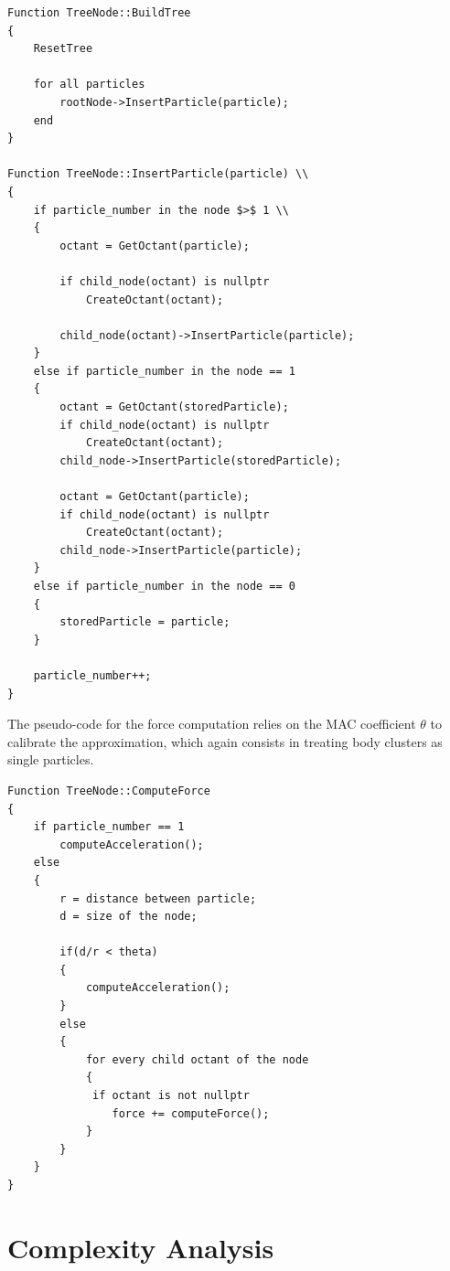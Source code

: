 \documentclass{article}
\begin{document}
\begin{boxA}
\begin{verbatim}
Function TreeNode::BuildTree
{
    ResetTree

    for all particles
        rootNode->InsertParticle(particle);
    end
}

Function TreeNode::InsertParticle(particle) \\
{
    if particle_number in the node $>$ 1 \\
    {
        octant = GetOctant(particle);

        if child_node(octant) is nullptr
            CreateOctant(octant);

        child_node(octant)->InsertParticle(particle);
    }
    else if particle_number in the node == 1
    {
        octant = GetOctant(storedParticle);
        if child_node(octant) is nullptr 
            CreateOctant(octant);
        child_node->InsertParticle(storedParticle);
        
        octant = GetOctant(particle);
        if child_node(octant) is nullptr 
            CreateOctant(octant);
        child_node->InsertParticle(particle);
    }
    else if particle_number in the node == 0
    {
        storedParticle = particle;
    }
    
    particle_number++;
}
\end{verbatim}
\end{boxA} 

\newpage
The pseudo-code for the force computation relies on the MAC coefficient $\theta$ to calibrate the approximation, which again consists in treating body clusters as single particles.
\begin{boxA}
\begin{verbatim}
Function TreeNode::ComputeForce
{
    if particle_number == 1
        computeAcceleration();
    else 
    {
        r = distance between particle; 
        d = size of the node;

        if(d/r < theta)
        {
            computeAcceleration();
        }
        else 
        {
            for every child octant of the node
            {
             if octant is not nullptr
                force += computeForce();
            }
        }    
    }
}
\end{verbatim}
\end{boxA}

\newpage
\section{Complexity Analysis}
\end{document}
